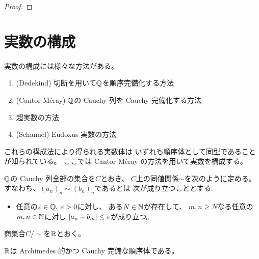 \documentclass[report]{jlreq}
\begin{document}
\begin{proof}
    \TODO{}
\end{proof}

%
\section{実数の構成}

実数の構成には様々な方法がある\cite{noauthor_construction_2023}。

\begin{enumerate}
    \item (Dedekind) 切断を用いて$\mathbb{Q}$を順序完備化する方法
    \item (Cantor-M\'eray) $\mathbb{Q}$の Cauchy 列を Cauchy 完備化する方法
    \item 超実数の方法
    \item (Schanuel) Eudoxus 実数の方法
\end{enumerate}

これらの構成法により得られる実数体は
いずれも順序体として同型であることが知られている。
ここでは Cantor-M\'eray の方法を用いて実数を構成する。

\begin{definition}[集合としての$\R$]
    $\mathbb{Q}$の Cauchy 列全部の集合を$C$とおき、
    $C$上の同値関係$\sim$を次のように定める。
    すなわち、$(a_n)_n \sim (b_n)_n$であるとは
    次が成り立つこととする:
    \begin{itemize}
        \item 任意の$\varepsilon \in \mathbb{Q}, \; \varepsilon > 0$に対し、
            ある$N \in \mathbb{N}$が存在して、
            $m, n \ge N$なる任意の$m, n \in \mathbb{N}$に対し
            $|a_n - b_m| \le \varepsilon$が成り立つ。
    \end{itemize}
    商集合$C / \sim$を$\R$とおく。
\end{definition}

\begin{definition}[体としての$\R$]
\end{definition}

\begin{definition}[順序体としての$\R$]
\end{definition}

\begin{proposition}
    $\R$は
    Archimedes 的かつ Cauchy 完備な順序体である。
\end{proposition}
\end{document}
